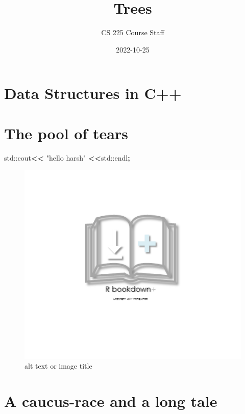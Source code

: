 \documentclass[
]{book}
\title{Trees}
\author{CS 225 Course Staff}
\date{2022-10-25}
\newenvironment{Shaded}{\begin{snugshade}}{\end{snugshade}}
\newcommand{\BuiltInTok}[1]{#1}
\newcommand{\NormalTok}[1]{#1}
\newcommand{\OperatorTok}[1]{\textcolor[rgb]{0.81,0.36,0.00}{\textbf{#1}}}
\newcommand{\StringTok}[1]{\textcolor[rgb]{0.31,0.60,0.02}{#1}}
\begin{document}
\maketitle

{
\setcounter{tocdepth}{2}
\tableofcontents
}
\hypertarget{data-structures-in-c}{%
\chapter{Data Structures in C++}\label{data-structures-in-c}}

\hypertarget{the-pool-of-tears}{%
\chapter{The pool of tears}\label{the-pool-of-tears}}

\begin{Shaded}
\begin{Highlighting}[]
\BuiltInTok{std::}\NormalTok{cout}\OperatorTok{\textless{}\textless{}} \StringTok{"hello harsh"} \OperatorTok{\textless{}\textless{}}\BuiltInTok{std::}\NormalTok{endl}\OperatorTok{;}
\end{Highlighting}
\end{Shaded}

\begin{figure}
\centering
\includegraphics{images/logo.png}
\caption{alt text or image title}
\end{figure}

\hypertarget{a-caucus-race-and-a-long-tale}{%
\chapter{A caucus-race and a long tale}\label{a-caucus-race-and-a-long-tale}}
\end{document}
